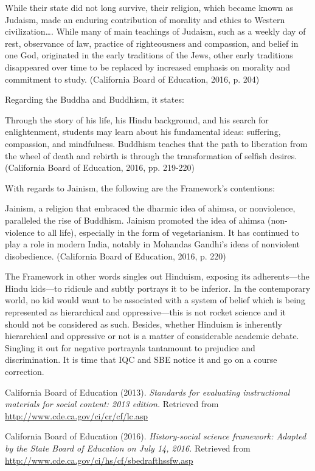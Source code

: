 While their state did not long survive, their religion, which became known as Judaism, made an enduring contribution of morality and ethics to Western civilization…. While many of main teachings of Judaism, such as a weekly day of rest, observance of law, practice of righteousness and compassion, and belief in one God, originated in the early traditions of the Jews, other early traditions disappeared over time to be replaced by increased emphasis on morality and commitment to study. (California Board of Education, 2016, p. 204)

Regarding the Buddha and Buddhism, it states: 

Through the story of his life, his Hindu background, and his search for enlightenment, students may learn about his fundamental ideas: suffering, compassion, and mindfulness. Buddhism teaches that the path to liberation from the wheel of death and rebirth is through the transformation of selfish desires. (California Board of Education, 2016, pp. 219-220) 

With regards to Jainism, the following are the Framework’s contentions:

Jainism, a religion that embraced the dharmic idea of ahimsa, or nonviolence, paralleled the rise of Buddhism. Jainism promoted the idea of ahimsa (non-violence to all life), especially in the form of vegetarianism. It has continued to play a role in modern India, notably in Mohandas Gandhi’s ideas of nonviolent disobedience. (California Board of Education, 2016, p. 220)

The Framework in other words singles out Hinduism, exposing its adherents—the Hindu kids—to ridicule and subtly portrays it to be inferior. In the contemporary world, no kid would want to be associated with a system of belief which is being represented as hierarchical and oppressive—this is not rocket science and it should not be considered as such. Besides, whether Hinduism is inherently hierarchical and oppressive or not is a matter of considerable academic debate. Singling it out for negative portrayals tantamount to prejudice and discrimination. It is time that IQC and SBE notice it and go on a course correction. 

\begin{thebibliography}{99}
 California Board of Education (2013). \textit{Standards for evaluating instructional materials for social content: 2013 edition.} Retrieved from \url{http://www.cde.ca.gov/ci/cr/cf/lc.asp}

 California Board of Education (2016). \textit{History-social science framework: Adapted by the State Board of Education on July 14, 2016.} Retrieved from \url{http://www.cde.ca.gov/ci/hs/cf/sbedrafthssfw.asp}
\end{thebibliography}
